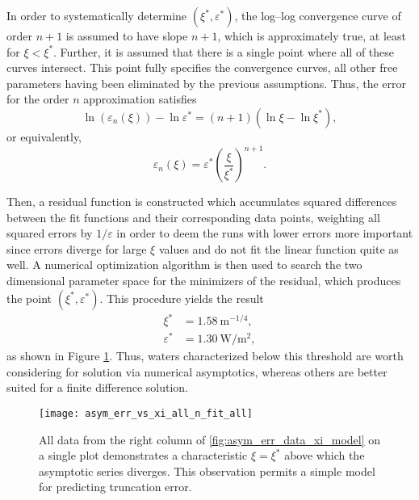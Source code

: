 In order to systematically determine $(\xi^*, \varepsilon^*)$, the log--log convergence curve of order $n+1$ is assumed to have slope $n+1$, which is approximately true, at least for $\xi<\xi^*$.
Further, it is assumed that there is a single point where all of these curves intersect.
This point fully specifies the convergence curves, all other free parameters having been eliminated by the previous assumptions.
Thus, the error for the order $n$ approximation satisfies
\begin{equation}
  \label{eqn:ln_eps_n}
  \ln\left(\varepsilon_n(\xi)\right) - \ln\varepsilon^* = (n+1)\left(\ln\xi - \ln\xi^*\right),
\end{equation}
or equivalently,
\begin{equation}
  \label{eqn:eps_n}
  \varepsilon_n(\xi) = \varepsilon^* \left(\frac{\xi}{\xi^*}\right)^{n+1}.
\end{equation}

Then, a residual function is constructed which accumulates squared differences between the fit functions and their corresponding data points, weighting all squared errors by $1/\varepsilon$ in order to deem the runs with lower errors more important since errors diverge for large $\xi$ values and do not fit the linear function quite as well.
A numerical optimization algorithm is then used to search the two dimensional parameter space for the minimizers of the residual, which produces the point $(\xi^*, \varepsilon^*)$.
This procedure yields the result
\begin{align}
  \xi^* &= \SI{1.58}{\m^{-1/4}}, \\
  \varepsilon^* &= \SI{1.30}{\W\per\m\squared},
\end{align}
as shown in Figure \ref{fig:asym_err_vs_xi_all_n_fit_all}.
Thus, waters characterized below this threshold are worth considering for solution via numerical asymptotics, whereas others are better suited for a finite difference solution.

\begin{figure}[H]
  \centering
  \texttt{[image: asym\_err\_vs\_xi\_all\_n\_fit\_all]}
  \caption{All data from the right column of \ref{fig:asym_err_data_xi_model} on a single plot demonstrates a characteristic $\xi=\xi^*$ above which the asymptotic series diverges. This observation permits a simple model for predicting truncation error.}
  \label{fig:asym_err_vs_xi_all_n_fit_all}
\end{figure}

